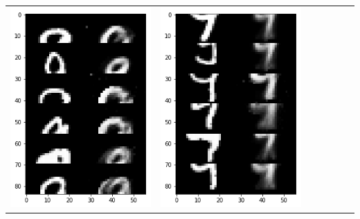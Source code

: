 \documentclass[12pt]{report} %
\begin{document}
\begin{tabular}{m{0.7cm}m{2.4cm}m{2.4cm}m{2.4cm}m{2.4cm}m{2.4cm}m{2.4cm}}
	\includegraphics[scale=0.3]{pictures/M1_9_up.png} & \includegraphics[scale=0.3]{pictures/M1_9_down.png} &

\end{tabular}
\end{document}
